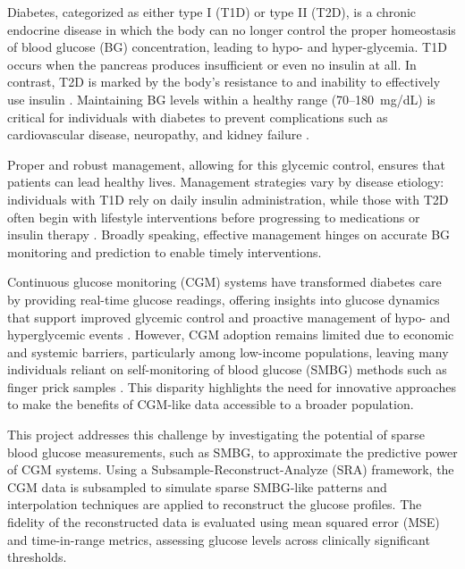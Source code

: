 Diabetes, categorized as either type I (T1D) or type II (T2D), is a chronic endocrine disease in which the body can no longer control the proper homeostasis of blood glucose (BG) concentration, leading to hypo-  and hyper-glycemia. T1D occurs when the pancreas produces insufficient or even no insulin at all. In contrast, T2D is marked by the body's resistance to and inability to effectively use insulin \cite{world_health_organization_global_2016}. Maintaining BG levels within a healthy range (70--180~mg/dL) is critical for individuals with diabetes to prevent complications such as cardiovascular disease, neuropathy, and kidney failure \cite{ADATIR, Roglic2016}. 

Proper and robust management, allowing for this glycemic control, ensures that patients can lead healthy lives. Management strategies vary by disease etiology: individuals with T1D rely on daily insulin administration, while those with T2D often begin with lifestyle interventions before progressing to medications or insulin therapy \cite{Roglic2016}. Broadly speaking, effective management hinges on accurate BG monitoring and prediction to enable timely interventions.

Continuous glucose monitoring (CGM) systems have transformed diabetes care by providing real-time glucose readings, offering insights into glucose dynamics that support improved glycemic control and proactive management of hypo- and hyperglycemic events \cite{Heinemann2018, Beck2017, Battelino2019}. However, CGM adoption remains limited due to economic and systemic barriers, particularly among low-income populations, leaving many individuals reliant on self-monitoring of blood glucose (SMBG) methods such as finger prick samples \cite{Oser2021, ADA}. This disparity highlights the need for innovative approaches to make the benefits of CGM-like data accessible to a broader population.

This project addresses this challenge by investigating the potential of sparse blood glucose measurements, such as SMBG, to approximate the predictive power of CGM systems. Using a Subsample-Reconstruct-Analyze (SRA) framework, the CGM data is subsampled to simulate sparse SMBG-like patterns and interpolation techniques are applied to reconstruct the glucose profiles. The fidelity of the reconstructed data is evaluated using mean squared error (MSE) and time-in-range metrics, assessing glucose levels across clinically significant thresholds. 


